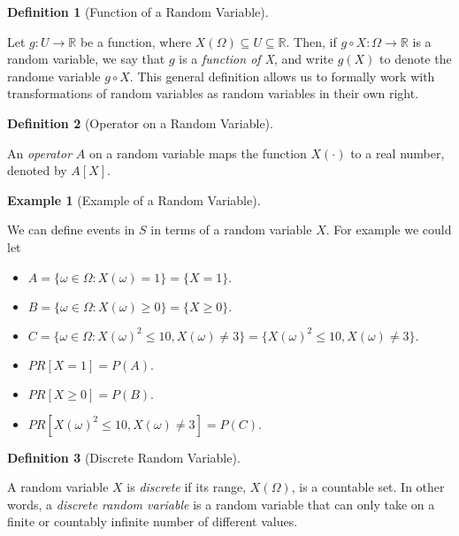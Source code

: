 \documentclass[
]{article}
\providecommand{\tightlist}{%
  \setlength{\itemsep}{0pt}\setlength{\parskip}{0pt}}
\theoremstyle{definition}
\newtheorem{definition}{Definition}[section]
\theoremstyle{definition}
\newtheorem{example}{Example}[section]
\theoremstyle{definition}
\theoremstyle{remark}
\begin{document}
\begin{definition}[Function of a Random Variable]
\protect\hypertarget{def:unlabeled-div-17}{}\label{def:unlabeled-div-17}

Let \(g: U \to \mathbb{R}\) be a function, where \(X(\Omega) \subseteq U \subseteq \mathbb{R}\). Then, if \(g \circ X: \Omega \to \mathbb{R}\) is a random variable, we say that \(g\) is a \emph{function of X}, and write \(g(X)\) to denote the randome variable \(g \circ X\). This general definition allows us to formally work with transformations of random variables as random variables in their own right.

\end{definition}

\begin{definition}[Operator on a Random Variable]
\protect\hypertarget{def:unlabeled-div-18}{}\label{def:unlabeled-div-18}

An \emph{operator} \(A\) on a random variable maps the function \(X(\cdot)\) to a real number, denoted by \(A[X]\).

\end{definition}

\begin{example}[Example of a Random Variable]
\protect\hypertarget{exm:unlabeled-div-19}{}\label{exm:unlabeled-div-19}

We can define events in \(S\) in terms of a random variable \(X\). For example we could let

\begin{itemize}
\tightlist
\item
  \(A = \{\omega \in \Omega: X(\omega) = 1\} = \{X = 1\}.\)
\item
  \(B = \{\omega \in \Omega: X(\omega) \geq 0\} = \{X \geq 0\}.\)
\item
  \(C = \{\omega \in \Omega: X(\omega)^2 \le 10, X(\omega) \neq 3\} = \{X(\omega)^2 \le 10, X(\omega) \neq 3\}.\)
\item
  \(PR[X = 1] = P(A).\)
\item
  \(PR[X \geq 0] = P(B).\)
\item
  \(PR[X(\omega)^2 \le 10, X(\omega) \neq 3] = P(C).\)
\end{itemize}

\end{example}

\begin{definition}[Discrete Random Variable]
\protect\hypertarget{def:unlabeled-div-20}{}\label{def:unlabeled-div-20}

A random variable \(X\) is \emph{discrete} if its range, \(X(\Omega)\), is a countable set. In other words, a \emph{discrete random variable} is a random variable that can only take on a finite or countably infinite number of different values.

\end{definition}
\end{document}
